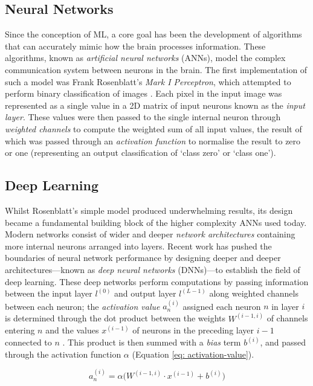 \documentclass[a4paper, 11pt]{report}
\begin{document}
    \subsection{Neural Networks}

    Since the conception of ML, a core goal has been the development of algorithms that can accurately mimic how the brain processes information. These algorithms, known as \emph{artificial neural networks} (ANNs), model the complex communication system between neurons in the brain. The first implementation of such a model was Frank Rosenblatt's \emph{Mark I Perceptron}, which attempted to perform binary classification of images \citep{rosenblatt-1958}. Each pixel in the input image was represented as a single value in a 2D matrix of input neurons known as the \emph{input layer}. These values were then passed to the single internal neuron through \emph{weighted channels} to compute the weighted sum of all input values,  the result of which was passed through an \emph{activation function} to normalise the result to zero or one (representing an output classification of `class zero' or `class one'). 


    \subsection{Deep Learning}
    \label{section: deep-learning}

    Whilst Rosenblatt's simple model produced underwhelming results, its design became a fundamental building block of the higher complexity ANNs used today. Modern networks consist of wider and deeper \emph{network architectures} containing more internal neurons arranged into layers. Recent work has pushed the boundaries of neural network performance by designing deeper and deeper architectures---known as \emph{deep neural networks} (DNNs)---to establish the field of deep learning. These deep networks perform computations by passing information between the input layer $l^{(0)}$ and output layer $l^{(L-1)}$ along weighted channels between each neuron; the \emph{activation value} $a^{(i)}_n$ assigned each neuron $n$ in layer $i$ is determined through the dot product between the weights $W^{(i-1, i)}$ of channels entering $n$ and the values $x^{(i-1)}$ of neurons in the preceding layer $i-1$ connected to $n$ \citep{witten-2017}. This product is then summed with a \emph{bias} term $b^{(i)}$, and passed through the activation function $\alpha$ (Equation \ref{eq: activation-value}).

    \begin{equation}
        \label{eq: activation-value}
        a^{(i)}_n = \alpha \Big( W^{(i-1, i)} \cdot x^{(i-1)} + b^{(i)} \Big)
    \end{equation}
\end{document}
